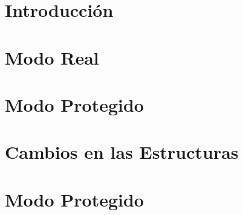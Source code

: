 \documentclass[a4paper,10pt, nofootinbib]{article}
\begin{document}
\maketitle

\tableofcontents
\clearpage

\thispagestyle{empty}


\clearpage


\section{Introducci\'on}

\clearpage

\section{Modo Real}

\clearpage

\section{Modo Protegido}

\clearpage

\section{Cambios en las Estructuras}

\clearpage


\clearpage

\section{Modo Protegido}

\clearpage
\end{document}

